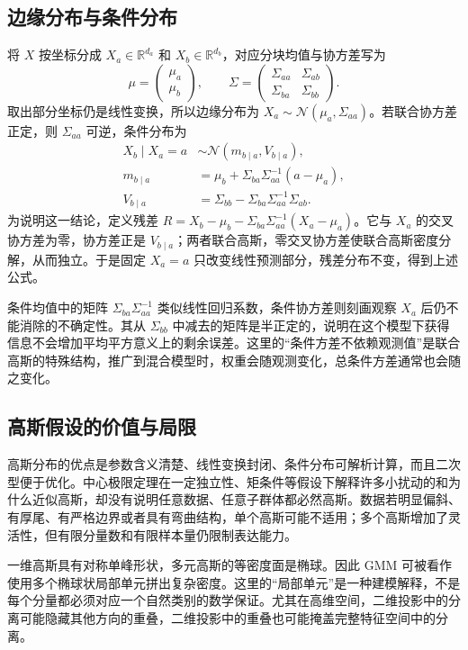 \documentclass[UTF8,12pt,a4paper,fontset=fandol]{ctexart}
\begin{document}
\subsection{边缘分布与条件分布}
将 $X$ 按坐标分成 $X_a\in\mathbb R^{d_a}$ 和 $X_b\in\mathbb R^{d_b}$，对应分块均值与协方差写为
\[
\mu=\begin{pmatrix}\mu_a\\\mu_b\end{pmatrix},\qquad
\Sigma=\begin{pmatrix}\Sigma_{aa}&\Sigma_{ab}\\\Sigma_{ba}&\Sigma_{bb}\end{pmatrix}.
\]
取出部分坐标仍是线性变换，所以边缘分布为 $X_a\sim\mathcal N(\mu_a,\Sigma_{aa})$。若联合协方差正定，则 $\Sigma_{aa}$ 可逆，条件分布为
\begin{align}
X_b\mid X_a=a&\sim\mathcal N(m_{b\mid a},V_{b\mid a}),\label{eq:gmm-gaussian-conditional}\\
m_{b\mid a}&=\mu_b+\Sigma_{ba}\Sigma_{aa}^{-1}(a-\mu_a),\nonumber\\
V_{b\mid a}&=\Sigma_{bb}-\Sigma_{ba}\Sigma_{aa}^{-1}\Sigma_{ab}.\nonumber
\end{align}
为说明这一结论，定义残差 $R=X_b-\mu_b-\Sigma_{ba}\Sigma_{aa}^{-1}(X_a-\mu_a)$。它与 $X_a$ 的交叉协方差为零，协方差正是 $V_{b\mid a}$；两者联合高斯，零交叉协方差使联合高斯密度分解，从而独立。于是固定 $X_a=a$ 只改变线性预测部分，残差分布不变，得到上述公式。

条件均值中的矩阵 $\Sigma_{ba}\Sigma_{aa}^{-1}$ 类似线性回归系数，条件协方差则刻画观察 $X_a$ 后仍不能消除的不确定性。其从 $\Sigma_{bb}$ 中减去的矩阵是半正定的，说明在这个模型下获得信息不会增加平均平方意义上的剩余误差。这里的“条件方差不依赖观测值”是联合高斯的特殊结构，推广到混合模型时，权重会随观测变化，总条件方差通常也会随之变化。

\subsection{高斯假设的价值与局限}
高斯分布的优点是参数含义清楚、线性变换封闭、条件分布可解析计算，而且二次型便于优化。中心极限定理在一定独立性、矩条件等假设下解释许多小扰动的和为什么近似高斯，却没有说明任意数据、任意子群体都必然高斯。数据若明显偏斜、有厚尾、有严格边界或者具有弯曲结构，单个高斯可能不适用；多个高斯增加了灵活性，但有限分量数和有限样本量仍限制表达能力。

一维高斯具有对称单峰形状，多元高斯的等密度面是椭球。因此 GMM 可被看作使用多个椭球状局部单元拼出复杂密度。这里的“局部单元”是一种建模解释，不是每个分量都必须对应一个自然类别的数学保证。尤其在高维空间，二维投影中的分离可能隐藏其他方向的重叠，二维投影中的重叠也可能掩盖完整特征空间中的分离。
\end{document}
